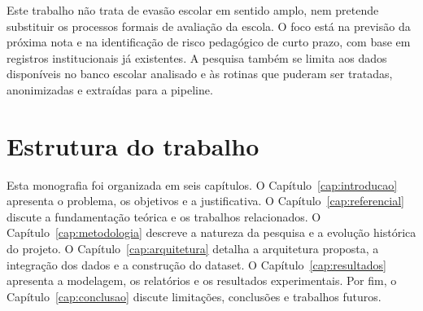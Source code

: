 Este trabalho n\~ao trata de evas\~ao escolar em sentido amplo, nem pretende substituir os processos formais de avalia\c{c}\~ao da escola. O foco est\'a na previs\~ao da pr\'oxima nota e na identifica\c{c}\~ao de risco pedag\'ogico de curto prazo, com base em registros institucionais j\'a existentes. A pesquisa tamb\'em se limita aos dados dispon\'iveis no banco escolar analisado e \`as rotinas que puderam ser tratadas, anonimizadas e extra\'idas para a pipeline.

\section{Estrutura do trabalho}
\label{sec:estrutura}

Esta monografia foi organizada em seis cap\'itulos. O Cap\'itulo~\ref{cap:introducao} apresenta o problema, os objetivos e a justificativa. O Cap\'itulo~\ref{cap:referencial} discute a fundamenta\c{c}\~ao te\'orica e os trabalhos relacionados. O Cap\'itulo~\ref{cap:metodologia} descreve a natureza da pesquisa e a evolu\c{c}\~ao hist\'orica do projeto. O Cap\'itulo~\ref{cap:arquitetura} detalha a arquitetura proposta, a integra\c{c}\~ao dos dados e a constru\c{c}\~ao do dataset. O Cap\'itulo~\ref{cap:resultados} apresenta a modelagem, os relat\'orios e os resultados experimentais. Por fim, o Cap\'itulo~\ref{cap:conclusao} discute limita\c{c}\~oes, conclus\~oes e trabalhos futuros.
